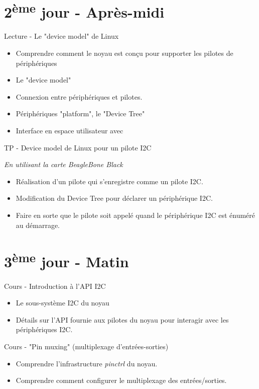 \documentclass[a4paper,12pt,obeyspaces,spaces,hyphens]{article}
\begin{document}
\section{2\textsuperscript{ème} jour - Après-midi}

\feagendatwocolumn
{Lecture - Le "device model" de Linux}
{
  \begin{itemize}
  \item Comprendre comment le noyau est conçu pour supporter les pilotes
    de périphériques
  \item Le "device model"
  \item Connexion entre périphériques et pilotes.
  \item Périphériques "platform", le "Device Tree"
  \item Interface en espace utilisateur avec 
  \end{itemize}
}
{TP - Device model de Linux pour un pilote I2C}
{
  {\em En utilisant la carte BeagleBone Black}
  \begin{itemize}
  \item Réalisation d'un pilote qui s'enregistre comme
     un pilote I2C.
  \item Modification du Device Tree pour déclarer un
     périphérique I2C.
  \item Faire en sorte que le pilote soit appelé quand le
     périphérique I2C est énuméré au démarrage.
  \end{itemize}
}

\section{3\textsuperscript{ème} jour - Matin}

\feagendatwocolumn
{Cours - Introduction à l'API I2C}
{
  \begin{itemize}
  \item Le sous-système I2C du noyau
  \item Détails sur l'API fournie aux pilotes du noyau pour interagir
    avec les périphériques I2C.
  \end{itemize}
}
{Cours - "Pin muxing" (multiplexage d'entrées-sorties)}
{
  \begin{itemize}
  \item Comprendre l'infrastructure {\em pinctrl} du noyau.
  \item Comprendre comment configurer le multiplexage des
    entrées/sorties.
  \end{itemize}
}
\end{document}
